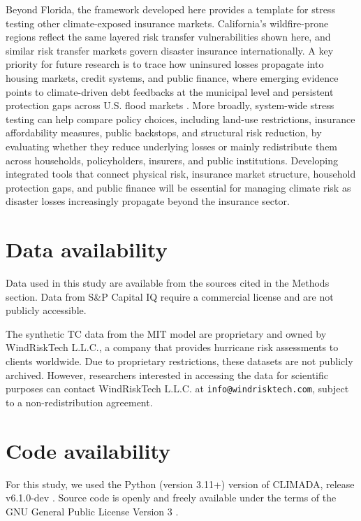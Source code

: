 \documentclass[fleqn,10pt]{wlscirep}
\begin{document}
Beyond Florida, the framework developed here provides a template for stress testing other climate-exposed insurance markets. California's wildfire-prone regions \cite{abatzoglou_impact_2016} reflect the same layered risk transfer vulnerabilities shown here, and similar risk transfer markets govern disaster insurance internationally. A key priority for future research is to trace how uninsured losses propagate into housing markets, credit systems, and public finance, where emerging evidence points to climate-driven debt feedbacks at the municipal level \cite{mishra_physical_2026} and persistent protection gaps across U.S. flood markets \cite{amornsiripanitch_measuring_2025}. More broadly, system-wide stress testing can help compare policy choices, including land-use restrictions, insurance affordability measures, public backstops, and structural risk reduction, by evaluating whether they reduce underlying losses or mainly redistribute them across households, policyholders, insurers, and public institutions. Developing integrated tools that connect physical risk, insurance market structure, household protection gaps, and public finance will be essential for managing climate risk as disaster losses increasingly propagate beyond the insurance sector.\medskip


\section*{Data availability}
Data used in this study are available from the sources cited in the Methods section. Data from S\&P Capital IQ require a commercial license and are not publicly accessible.

The synthetic TC data from the MIT model are proprietary and owned by WindRiskTech L.L.C., a company that provides hurricane risk assessments to clients worldwide. Due to proprietary restrictions, these datasets are not publicly archived. However, researchers interested in accessing the data for scientific purposes can contact WindRiskTech L.L.C. at \nolinkurl{info@windrisktech.com}, subject to a non-redistribution agreement.

\section*{Code availability}
For this study, we used the Python (version 3.11+) version of CLIMADA, release v6.1.0-dev \cite{siguan_climada_2025}. Source code is openly and freely available under the terms of the GNU General Public License Version 3 \cite{aznar-siguan_climada_2019}.
\end{document}
